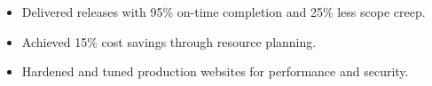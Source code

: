 \vspace{4pt}
\begin{itemize}
  \item Delivered releases with 95\% on-time completion and 25\% less scope creep.
  \item Achieved 15\% cost savings through resource planning.
\end{itemize}
\vspace{4pt}
\begin{itemize}
  \item Hardened and tuned production websites for performance and security.
\end{itemize}
